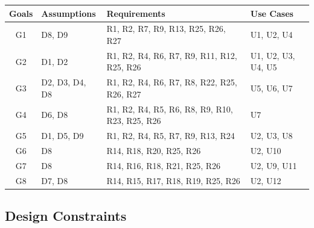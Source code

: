 \documentclass[../main.tex]{subfiles}
\begin{document}
\begin{center}
\begin{longtable}{| c | p{3cm} | p{6cm} | p{2.5cm} |} 
 \hline
 \textbf{Goals} & \textbf{Assumptions} &\textbf{Requirements} & \textbf{Use Cases} \\
 \hline
 G1 & D8, D9 & R1, R2, R7, R9, R13, R25, R26, R27 & U1, U2, U4 \\
 \hline
 G2 & D1, D2 & R1, R2, R4, R6, R7, R9, R11, R12, R25, R26 & U1, U2, U3, U4, U5\\
 \hline
 G3 & D2, D3, D4, D8 & R1, R2, R4, R6, R7, R8, R22, R25, R26, R27 & U5, U6, U7 \\
 \hline
 G4 & D6, D8 & R1, R2, R4, R5, R6, R8, R9, R10, R23, R25, R26 & U7 \\
 \hline
 G5 & D1, D5, D9 & R1, R2, R4, R5, R7, R9, R13, R24 
 & U2, U3, U8\\
 \hline
 G6 & D8 & R14, R18, R20, R25, R26 & U2, U10 \\
 \hline
 G7 & D8 & R14, R16, R18, R21, R25, R26 & U2, U9, U11 \\
 \hline
 G8 & D7, D8 & R14, R15, R17, R18, R19, R25, R26 & U2, U12 \\
 \hline


 \end{longtable}
 \end{center}

\newpage
\subsection{Design Constraints}
\end{document}
